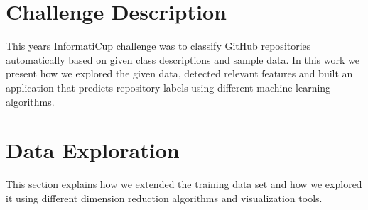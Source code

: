 \documentclass[a4paper,12pt]{article}
\begin{document}
\providecommand{\tightlist}{%
  \setlength{\itemsep}{0pt}\setlength{\parskip}{0pt}}

\newcommand{\specialcell}[2][c]{%
 \begin{tabular}[#1]{@{}c@{}}#2\end{tabular}}


\tableofcontents
\pagebreak

\section{Challenge Description}\label{challenge-description}

This years InformatiCup challenge was to classify GitHub repositories
automatically based on given class descriptions and sample data. In this
work we present how we explored the given data, detected relevant
features and built an application that predicts repository labels using
different machine learning algorithms.

\section{Data Exploration}\label{data-exploration}

This section explains how we extended the training data set and how we
explored it using different dimension reduction algorithms and
visualization tools.
\end{document}
